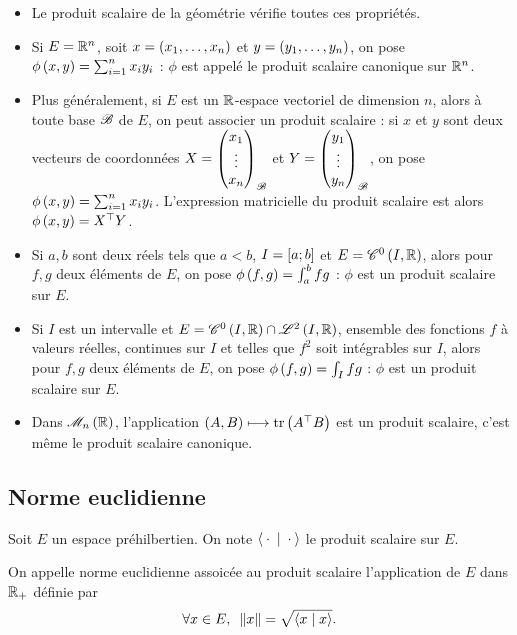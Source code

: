 \begin{itemize}
    \item Le produit scalaire de la géométrie vérifie toutes ces propriétés. \\
    \item Si \(E=\mathbb{R}^n\), soit \(x=\left(x_1,\dots,x_n\right)\) et \(y=\left(y_1,\dots,y_n\right)\), on pose \(\phi\left(x,y\right)=\sum_{i=1}^nx_iy_i\) : \(\phi\) est appelé le produit scalaire canonique sur \(\mathbb{R}^n\). \\
    \item Plus généralement, si \(E\) est un \(\mathbb{R}\)-espace vectoriel de dimension \(n\), alors à toute base \(\mathscr{B}\) de \(E\), on peut associer un produit scalaire : si \(x\) et \(y\) sont deux vecteurs de coordonnées \(X=\begin{pmatrix}x_1\\\vdots\\x_n\end{pmatrix}_{\mathscr{B}}\) et \(Y=\begin{pmatrix}y_1\\\vdots\\y_n\end{pmatrix}_{\mathscr{B}}\), on pose \(\phi\left(x,y\right)=\sum_{i=1}^nx_iy_i\). L'expression matricielle du produit scalaire est alors \(\phi\left(x,y\right)=X^{\top}Y\). \\
    \item Si \(a,b\) sont deux réels tels que \(a<b\), \(I=\left[a;b\right]\) et \(E=\mathscr{C}^{0}\left(I,\mathbb{R}\right)\), alors pour \(f,g\) deux éléments de \(E\), on pose \(\phi\left(f,g\right)=\int_a^bfg\) : \(\phi\) est un produit scalaire sur \(E\). \\
    \item Si \(I\) est un intervalle et \(E=\ensclasse{0}{I}{\R}\inter\integ{2}{I}{\R}\), ensemble des fonctions \(f\) à valeurs réelles, continues sur \(I\) et telles que \(f^2\) soit intégrables sur \(I\), alors pour \(f,g\) deux éléments de \(E\), on pose \(\phi\left(f,g\right)=\int_Ifg\) : \(\phi\) est un produit scalaire sur \(E\). \\
    \item Dans \(\M{n}[\R]\), l'application \(\left(A,B\right)\longmapsto\operatorname{tr}\left(A^{\top}B\right)\) est un produit scalaire, c'est même le produit scalaire canonique.
\end{itemize}

\subsection{Norme euclidienne}

\begin{defi}
Soit \(E\) un espace préhilbertien. On note \(\ps{}{}\) le produit scalaire sur \(E\).

On appelle norme euclidienne assoicée au produit scalaire l'application de \(E\) dans \(\mathbb{R}_+\) définie par \[\quantifs{\forall x\in E}\norme{x}=\sqrt{\ps{x}{x}}.\]
\end{defi}

